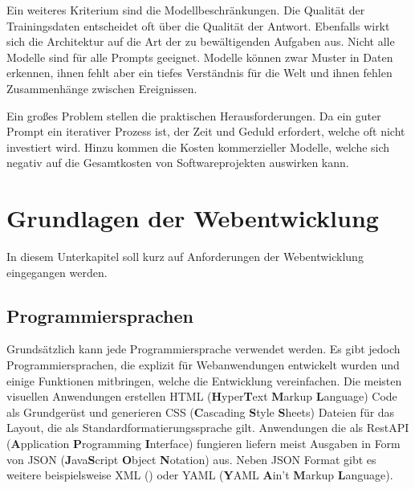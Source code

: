 Ein weiteres Kriterium sind die Modellbeschränkungen. Die Qualität der Trainingsdaten entscheidet oft über die Qualität der Antwort. Ebenfalls wirkt sich die Architektur auf die Art der zu bewältigenden Aufgaben aus. Nicht alle Modelle sind für alle Prompts geeignet. Modelle können zwar Muster in Daten erkennen, ihnen fehlt aber ein tiefes Verständnis für die Welt und ihnen fehlen Zusammenhänge zwischen Ereignissen.\vspace{0.2cm}

Ein großes Problem stellen die praktischen Herausforderungen. Da ein guter Prompt ein iterativer Prozess ist, der Zeit und Geduld erfordert, welche oft nicht investiert wird. Hinzu kommen die Kosten kommerzieller Modelle, welche sich negativ auf die Gesamtkosten von Softwareprojekten auswirken kann.

\section{Grundlagen der Webentwicklung}
In diesem Unterkapitel soll kurz auf Anforderungen der Webentwicklung eingegangen werden.


\subsection{Programmiersprachen}
Grundsätzlich kann jede Programmiersprache verwendet werden. Es gibt jedoch Programmiersprachen, die explizit für Webanwendungen entwickelt wurden und einige Funktionen mitbringen, welche die Entwicklung vereinfachen. Die meisten visuellen Anwendungen erstellen HTML (\textbf{H}yper\textbf{T}ext \textbf{M}arkup \textbf{L}anguage) Code als Grundgerüst und generieren CSS (\textbf{C}ascading \textbf{S}tyle \textbf{S}heets) Dateien für das Layout, die als Standardformatierungssprache gilt. Anwendungen die als RestAPI (\textbf{A}pplication \textbf{P}rogramming \textbf{I}nterface) fungieren liefern meist Ausgaben in Form von JSON (\textbf{J}ava\textbf{S}cript \textbf{O}bject \textbf{N}otation) aus. Neben JSON Format gibt es weitere beispielsweise XML () oder YAML (\textbf{Y}AML \textbf{A}in’t \textbf{M}arkup \textbf{L}anguage).\vspace{0.2cm}


